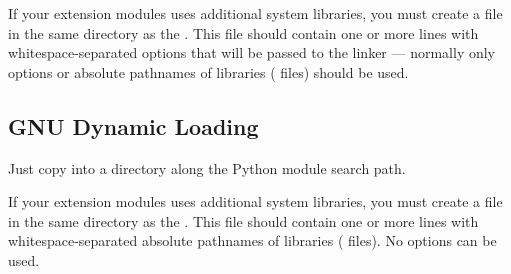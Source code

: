 If your extension modules uses additional system libraries, you must
create a file  in the same directory as the
.  This file should contain one or more lines with
whitespace-separated options that will be passed to the linker ---
normally only  options or absolute pathnames of libraries
( files) should be used.


\subsection{GNU Dynamic Loading}

Just copy  into a directory along the Python module
search path.

If your extension modules uses additional system libraries, you must
create a file  in the same directory as the
.  This file should contain one or more lines with
whitespace-separated absolute pathnames of libraries (
files).  No  options can be used.





